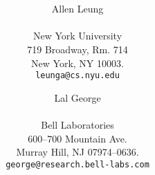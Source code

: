 \usepackage{mltex}
\usepackage{wrapfig}
\usepackage{float}
\usepackage{fancyheadings}
\usepackage{utopia}

   \setlength{\textwidth}{6.5in}
   \setlength{\evensidemargin}{0in}
   \setlength{\oddsidemargin}{0in}
   \setlength{\textheight}{8in}
   \setlength{\topmargin}{-0.5in}

   \pagestyle{fancyplain}

   \newcommand{\edge}[1]{\rightarrow_{#1}}
   \newcommand{\union}{\cup}
   \newcommand{\Union}{\bigcup}
   \newcommand{\overrides}{overrides}
   \newcommand{\defas}{\stackrel{\rm as}{=}}

   \renewcommand{\sectionmark}[1]{\markright{\thesection\ #1}}
   \renewcommand{\subsectionmark}[1]{\markright{\thesubsection\ #1}}
   \newcommand{\Term}[1]{\mbox{\it #1}}
   \lhead[\fancyplain{}{\bfseries\thepage}]%
         {\fancyplain{}{\bfseries\rightmark}}
   \rhead[\fancyplain{}{\bfseries\leftmark}]%
         {\fancyplain{}{\bfseries\thepage}}
   \cfoot{}

   \newenvironment{Figure}{\begin{figure}[htbp]}{\end{figure}}


   \title{\bf \LARGE \MLTeX} 
   \author{\begin{tabular}{c}
            Allen Leung \\ \\
            New York University \\
            719 Broadway, Rm. 714 \\ 
            New York, NY 10003. \\
            {\tt leunga@cs.nyu.edu}
           \end{tabular}
        \and 
           \begin{tabular}{c}
            Lal George \\ \\
            Bell Laboratories \\
            600--700 Mountain Ave. \\
            Murray Hill, NJ 07974--0636. \\
            {\tt george@research.bell-labs.com}
            \end{tabular}
     }

